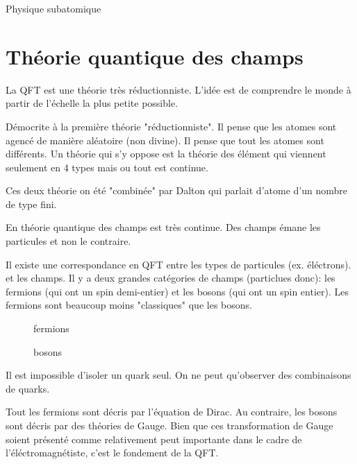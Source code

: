 


{{ \Huge Physique subatomique}}



\section*{Théorie quantique des champs}

La QFT est une théorie très réductionniste. L'idée est de comprendre le monde à partir de l'échelle la plus petite possible.

\begin{tcolorbox}[title=Remarque (Historique/Paradigme)]
	Démocrite à la première théorie "réductionniste". Il pense que les atomes  sont agencé de manière aléatoire (non divine). Il pense que tout les atomes sont différents. Un théorie qui s'y oppose est la théorie des élément qui viennent seulement en 4 types mais ou tout est continue. 
	 

Ces deux théorie on été "combinée" par Dalton qui parlait d'atome d'un nombre de type fini.

En théorie quantique des champs est très continue. Des champs émane les particules et non le contraire.

\end{tcolorbox}

Il existe une correspondance en QFT entre les types de particules (ex. éléctrons). et les champs. Il y a deux grandes catégories de champs (particlues donc): les fermions (qui ont un spin demi-entier) et les bosons (qui ont un spin entier). Les fermions sont beaucoup moins "classiques" que les bosons. 


\begin{figure}[h!]
    \centering
    \caption{fermions}
    \label{fig:tableau-periodique}
\end{figure}

\begin{figure}[h!]
    \centering
    \caption{bosons}
    \label{fig:bosons}
\end{figure}


Il est impossible d'isoler un quark seul. On ne peut qu'observer des combinaisons de quarks.


Tout les fermions sont décris par l'équation de Dirac. Au contraire, les bosons sont décris par des théories de Gauge. Bien que ces transformation de Gauge soient présenté comme relativement peut importante dans le cadre de l'éléctromagnétiste, c'est le fondement de la QFT.

